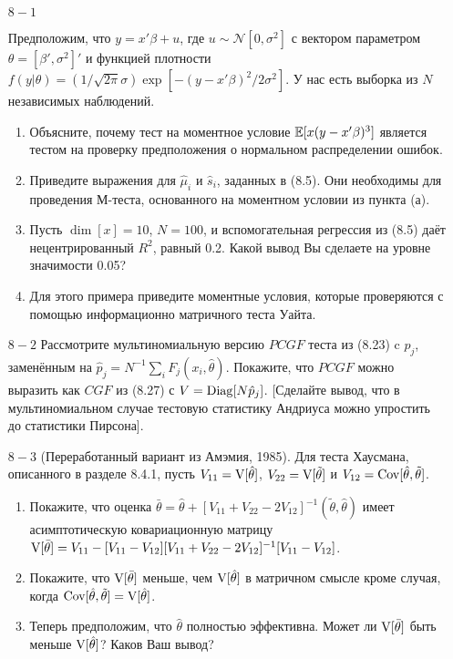 \begin{enumerate}
\item [$8 - 1$] 

Предположим, что $y = x'\beta + u$, где $u \sim \mathcal{N}[0,\sigma^2]$ с вектором параметром $\theta = [\beta', \sigma^2]'$ и функцией плотности $f(y|\theta) = (1/\sqrt{2\pi}\sigma)\exp[-(y - x'\beta)^2/2\sigma^2].$  У нас есть выборка из $N$ независимых наблюдений.
\begin{enumerate}
\item Объясните, почему тест на моментное условие $\mathbb{E}[x(y - x'\beta)^3]$ является тестом на проверку предположения о нормальном распределении ошибок.
\item Приведите выражения для $\hat{\mu}_i$ и $\hat{s}_i$, заданных в (8.5). Они необходимы для проведения М-теста, основанного на моментном условии из пункта (а).
\item Пусть $\dim[x] = 10$, $N = 100$, и вспомогательная регрессия из (8.5) даёт нецентрированный $R^2$, равный 0.2. Какой вывод Вы сделаете на уровне значимости 0.05?
\item Для этого примера приведите моментные условия, которые проверяются с помощью информационно матричного теста Уайта.
\end{enumerate}
\item [$8 - 2$] Рассмотрите мультиномиальную версию $PCGF$ теста из (8.23) c $p_j$, заменённым на $\hat{p}_j = N^{-1}\sum_i F_j(x_i, \hat{\theta})$. Покажите, что $PCGF$ можно выразить как $CGF$ из (8.27)  с $V = \mathrm{Diag}[N\hat{p}_j]$. [Сделайте вывод, что в мультиномиальном случае тестовую статистику Андриуса можно упростить до статистики Пирсона].
\item [$8 - 3$] (Переработанный вариант из Амэмия, 1985). Для теста Хаусмана, описанного в разделе 8.4.1, пусть $V_{11} = \mathrm{V}[\hat{\theta}]$, $V_{22} = \mathrm{V}[\tilde{\theta}]$ и $V_{12} = \mathrm{Cov}[\hat{\theta},\tilde{\theta}]$.
\begin{enumerate}
\item Покажите, что оценка $\bar{\theta} = \hat{\theta} + [V_{11} + V_{22} - 2V_{12}]^{-1}(\tilde{\theta},\hat{\theta})$ имеет асимптотическую ковариационную матрицу $\mathrm{V}[\bar{\theta}] = V_{11} - [V_{11} - V_{12}][V_{11} + V_{22} - 2V_{12}]^{-1}[V_{11} - V_{12}]$.
\item Покажите, что $\mathrm{V}[\bar{\theta}]$ меньше, чем $\mathrm{V}[\hat{\theta}]$ в матричном смысле кроме случая, когда $\mathrm{Cov}[\hat{\theta},\tilde{\theta}] = \mathrm{V}[\hat{\theta}]$.
\item Теперь предположим, что $\hat{\theta}$ полностью эффективна. Может ли $\mathrm{V}[\bar{\theta}]$ быть меньше $\mathrm{V}[\hat{\theta}]$? Каков Ваш вывод?

\end{enumerate}
\end{enumerate}
